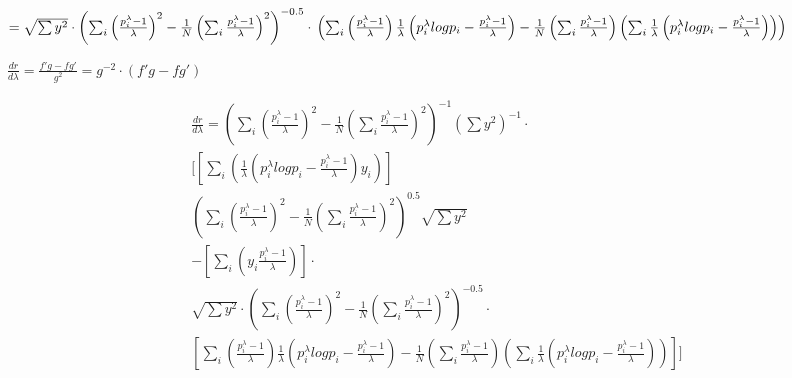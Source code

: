 \begin{math}
=
\sqrt{\sum{y^2}}\cdot
\left(\sum_i\left(\frac{p_i^{\lambda}-1}{\lambda}\right)^2-\frac{1}{N}\left(\sum_i \frac{p_i^{\lambda}-1}{\lambda}\right)^2  \right)^{-0.5}
\cdot\\
\left(
\sum_i\left(\frac{p_i^{\lambda}-1}{\lambda} \right)\frac{1}{\lambda}\left(p_i^{\lambda}log{p_i}-\frac{p_i^{\lambda}-1}{\lambda}\right)
-\frac{1}{N}\left(\sum_i \frac{p_i^{\lambda}-1}{\lambda}\right) \left(\sum_i \frac{1}{\lambda}\left(p_i^{\lambda}log{p_i}-\frac{p_i^{\lambda}-1}{\lambda}\right) \right)
\right)
\end{math}

\begin{math}
\frac{dr}{d\lambda}=\frac{f'g-fg'}{g^2}=g^{-2}\cdot\left(f'g-fg'\right)
\end{math}

\begin{multline}
\frac{dr}{d\lambda}=
\left(\sum_i\left(\frac{p_i^{\lambda}-1}{\lambda}\right)^2-\frac{1}{N}\left(\sum_i \frac{p_i^{\lambda}-1}{\lambda}\right)^2  \right)^{-1}
\left(\sum{y^2}\right)^{-1}\cdot  \\
[
\left[
\sum_i\left(\frac{1}{\lambda}\left(p_i^{\lambda}log{p_i}-\frac{p_i^{\lambda}-1}{\lambda}\right)y_i\right)
\right]  \\
\left(\sum_i\left(\frac{p_i^{\lambda}-1}{\lambda}\right)^2-\frac{1}{N}\left(\sum_i \frac{p_i^{\lambda}-1}{\lambda}\right)^2  \right)^{0.5}
\sqrt{\sum{y^2}}  \\
-
\left[\sum_i \left(y_i\frac{p_i^{\lambda}-1}{\lambda}\right)\right]\cdot\\
\sqrt{\sum{y^2}}\cdot
\left(\sum_i\left(\frac{p_i^{\lambda}-1}{\lambda}\right)^2-\frac{1}{N}\left(\sum_i \frac{p_i^{\lambda}-1}{\lambda}\right)^2  \right)^{-0.5}
\cdot\\
\left[
\sum_i\left(\frac{p_i^{\lambda}-1}{\lambda} \right)\frac{1}{\lambda}\left(p_i^{\lambda}log{p_i}-\frac{p_i^{\lambda}-1}{\lambda}\right)
-\frac{1}{N}\left(\sum_i \frac{p_i^{\lambda}-1}{\lambda}\right) \left(\sum_i \frac{1}{\lambda}\left(p_i^{\lambda}log{p_i}-\frac{p_i^{\lambda}-1}{\lambda}\right) \right)
\right]
]
\end{multline}


